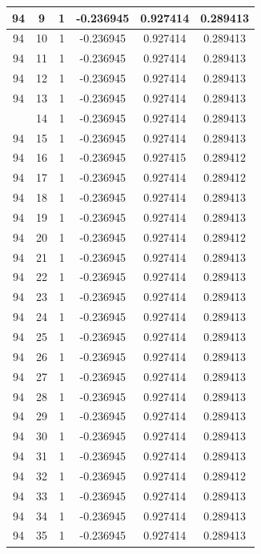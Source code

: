 \documentclass[12pt,a4paper]{article}
\numberwithin{equation}{section}
\numberwithin{figure}{section}
\numberwithin{table}{section}
\begin{document}
\begin{longtable}{|c|c|c|c|c|c|}
94 & 9 & 1 & -0.236945 & 0.927414 & 0.289413 \\ \hline
94 & 10 & 1 & -0.236945 & 0.927414 & 0.289413 \\ \hline
94 & 11 & 1 & -0.236945 & 0.927414 & 0.289413 \\ \hline
94 & 12 & 1 & -0.236945 & 0.927414 & 0.289413 \\ \hline
94 & 13 & 1 & -0.236945 & 0.927414 & 0.289413 \\ \hline
\pagebreak
94 & 14 & 1 & -0.236945 & 0.927414 & 0.289413 \\ \hline
94 & 15 & 1 & -0.236945 & 0.927414 & 0.289413 \\ \hline
94 & 16 & 1 & -0.236945 & 0.927415 & 0.289412 \\ \hline
94 & 17 & 1 & -0.236945 & 0.927414 & 0.289412 \\ \hline
94 & 18 & 1 & -0.236945 & 0.927414 & 0.289413 \\ \hline
94 & 19 & 1 & -0.236945 & 0.927414 & 0.289413 \\ \hline
94 & 20 & 1 & -0.236945 & 0.927414 & 0.289412 \\ \hline
94 & 21 & 1 & -0.236945 & 0.927414 & 0.289413 \\ \hline
94 & 22 & 1 & -0.236945 & 0.927414 & 0.289413 \\ \hline
94 & 23 & 1 & -0.236945 & 0.927414 & 0.289413 \\ \hline
94 & 24 & 1 & -0.236945 & 0.927414 & 0.289413 \\ \hline
94 & 25 & 1 & -0.236945 & 0.927414 & 0.289413 \\ \hline
94 & 26 & 1 & -0.236945 & 0.927414 & 0.289413 \\ \hline
94 & 27 & 1 & -0.236945 & 0.927414 & 0.289413 \\ \hline
94 & 28 & 1 & -0.236945 & 0.927414 & 0.289413 \\ \hline
94 & 29 & 1 & -0.236945 & 0.927414 & 0.289413 \\ \hline
94 & 30 & 1 & -0.236945 & 0.927414 & 0.289413 \\ \hline
94 & 31 & 1 & -0.236945 & 0.927414 & 0.289413 \\ \hline
94 & 32 & 1 & -0.236945 & 0.927414 & 0.289412 \\ \hline
94 & 33 & 1 & -0.236945 & 0.927414 & 0.289413 \\ \hline
94 & 34 & 1 & -0.236945 & 0.927414 & 0.289413 \\ \hline
94 & 35 & 1 & -0.236945 & 0.927414 & 0.289413 \\ \hline

\end{longtable}
\end{document}
